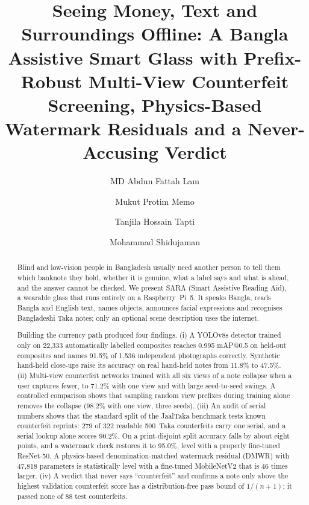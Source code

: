 \documentclass[preprint,12pt]{elsarticle}
\begin{document}
\begin{frontmatter}

\title{Seeing Money, Text and Surroundings Offline: A Bangla Assistive Smart Glass with Prefix-Robust Multi-View Counterfeit Screening, Physics-Based Watermark Residuals and a Never-Accusing Verdict}

\author{MD Abdun Fattah Lam}
\author{Mukut Protim Memo}
\author{Tanjila Hossain Tapti}
\author{Mohammad Shidujaman}

\begin{abstract}
Blind and low-vision people in Bangladesh usually need another person to tell them which banknote they hold, whether it is genuine, what a label says and what is ahead, and the answer cannot be checked. We present SARA (Smart Assistive Reading Aid), a wearable glass that runs entirely on a Raspberry~Pi~5. It speaks Bangla, reads Bangla and English text, names objects, announces facial expressions and recognises Bangladeshi Taka notes; only an optional scene description uses the internet.

Building the currency path produced four findings.
(i) A YOLOv8s detector trained only on 22,333 automatically labelled composites reaches 0.995 mAP@0.5 on held-out composites and names 91.5\% of 1,536 independent photographs correctly. Synthetic hand-held close-ups raise its accuracy on real hand-held notes from 11.8\% to 47.5\%.
(ii) Multi-view counterfeit networks trained with all six views of a note collapse when a user captures fewer, to 71.2\% with one view and with large seed-to-seed swings. A controlled comparison shows that sampling random view prefixes during training alone removes the collapse (98.2\% with one view, three seeds).
(iii) An audit of serial numbers shows that the standard split of the JaalTaka benchmark tests known counterfeit reprints: 279 of 322 readable 500~Taka counterfeits carry one serial, and a serial lookup alone scores 90.2\%. On a print-disjoint split accuracy falls by about eight points, and a watermark check restores it to 95.0\%, level with a properly fine-tuned ResNet-50. A physics-based denomination-matched watermark residual (DMWR) with 47,818 parameters is statistically level with a fine-tuned MobileNetV2 that is 46 times larger.
(iv) A verdict that never says ``counterfeit'' and confirms a note only above the highest validation counterfeit score has a distribution-free pass bound of $1/(n{+}1)$; it passed none of 88 test counterfeits.


\end{abstract}
\end{frontmatter}
\end{document}
